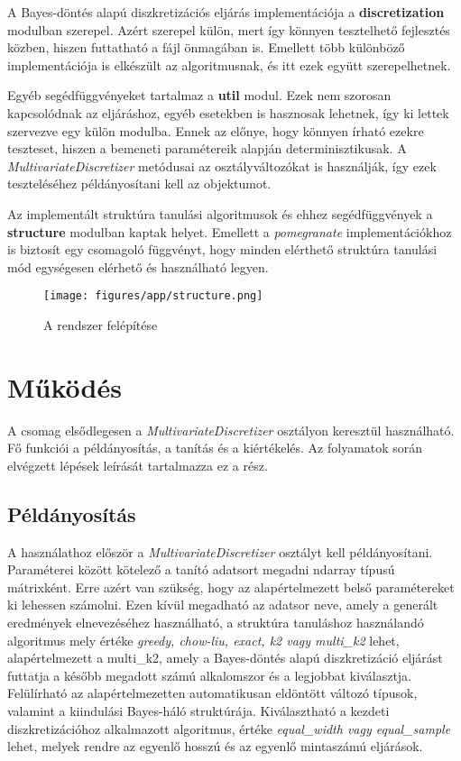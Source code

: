 A Bayes-döntés alapú diszkretizációs eljárás implementációja a \textbf{discretization} modulban szerepel. Azért szerepel külön, mert így könnyen tesztelhető fejlesztés közben, hiszen futtatható a fájl önmagában is. Emellett több különböző implementációja is elkészült az algoritmusnak, és itt ezek együtt szerepelhetnek.

Egyéb segédfüggvényeket tartalmaz a \textbf{util} modul. Ezek nem szorosan kapcsolódnak az eljáráshoz, egyéb esetekben is hasznosak lehetnek, így ki lettek szervezve egy külön modulba. Ennek az előnye, hogy könnyen írható ezekre teszteset, hiszen a bemeneti paramétereik alapján determinisztikusak. A \textit{MultivariateDiscretizer} metódusai az osztályváltozókat is használják, így ezek teszteléséhez példányosítani kell az objektumot.

Az implementált struktúra tanulási algoritmusok és ehhez segédfüggvények a \textbf{structure} modulban kaptak helyet. Emellett a \emph{pomegranate} implementációkhoz is biztosít egy csomagoló függvényt, hogy minden elérthető struktúra tanulási mód egységesen elérhető és használható legyen.

\begin{figure}[htp]
    \centering
    \texttt{[image: figures/app/structure.png]}
    \caption{A rendszer felépítése}
    \label{fig:struktura-diagram}
\end{figure}


\section{Működés}
A csomag elsődlegesen a \emph{MultivariateDiscretizer} osztályon keresztül használható. Fő funkciói a példányosítás, a tanítás és a kiértékelés. Az folyamatok során elvégzett lépések leírását tartalmazza ez a rész.

\subsection{Példányosítás}
A használathoz először a \emph{MultivariateDiscretizer} osztályt kell példányosítani. Paraméterei között kötelező a tanító adatsort megadni ndarray típusú mátrixként. Erre azért van szükség, hogy az alapértelmezett belső paramétereket ki lehessen számolni. Ezen kívül megadható az adatsor neve, amely a generált eredmények elnevezéséhez használható, a struktúra tanuláshoz használandó algoritmus mely értéke \emph{greedy, chow-liu, exact, k2 vagy multi\_k2} lehet, alapértelmezett a multi\_k2, amely a Bayes-döntés alapú diszkretizáció eljárást futtatja a később megadott számú alkalomszor és a legjobbat kiválasztja. Felülírható az alapértelmezetten automatikusan eldöntött változó típusok, valamint a kiindulási Bayes-háló struktúrája. Kiválasztható a kezdeti diszkretizációhoz alkalmazott algoritmus, értéke \emph{equal\_width vagy equal\_sample} lehet, melyek rendre az egyenlő hosszú és az egyenlő mintaszámú eljárások.


